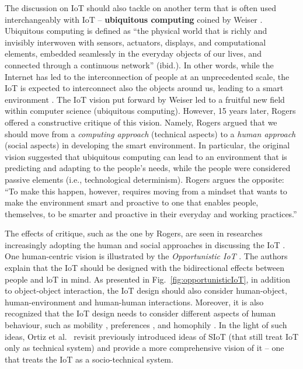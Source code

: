 The discussion on IoT should also tackle on another term that is often used interchangeably with IoT -- \textbf{ubiquitous computing} coined by Weiser \cite{weiser1991computer}. Ubiquitous computing is defined as ``the physical world that is richly and invisibly interwoven with sensors, actuators, displays, and computational elements, embedded seamlessly in the everyday objects of our lives, and connected through a continuous network'' (ibid.). In other words, while the Internet has led to the interconnection of people at an unprecedented scale, the IoT is expected to interconnect also the objects around us, leading to a smart environment \cite{gubbi2013internet}. %
The IoT vision put forward by Weiser \cite{weiser1991computer} led to a fruitful new field within computer science (ubiquitous computing). However, 15 years later, Rogers \cite{rogers2006moving} offered a constructive critique of this vision. Namely, Rogers argued that we should move from a \textit{computing approach} (technical aspects) to a \textit{human approach} (social aspects) in developing the smart environment. In particular, the original vision suggested that ubiquitous computing can lead to an environment that is predicting and adapting to the people's needs, while the people were considered passive elements (i.e., technological determinism). Rogers argues the opposite: ``To make this happen, however, requires moving from a mindset that wants to make the environment smart and proactive to one that enables people, themselves, to be smarter and proactive in their everyday and working practices.''

The effects of critique, such as the one by Rogers, are seen in researches increasingly adopting the human and social approaches in discussing the IoT \cite{ning2011future,guo2012opportunistic,tomasini2017effect}. One human-centric vision is illustrated by the \textit{Opportunistic IoT} \cite{guo2012opportunistic,guo2013opportunistic}. The authors explain that the IoT should be designed with the bidirectional effects between people and loT in mind. As presented in Fig.\ \ref{fig:opportunisticIoT}, in addition to object-object interaction, the IoT design should also consider human-object, human-environment and human-human interactions. Moreover, it is also recognized that the IoT design needs to consider different aspects of human behaviour, such as mobility \cite{tomasini2017effect}, preferences \cite{kowshalya2016community}, and homophily \cite{atzori2012social}. In the light of such ideas, Ortiz et al.\ \cite{ortiz2014cluster} revisit previously introduced ideas of {SIoT} (that still treat IoT only as technical system) and provide a more comprehensive vision of it -- one that treats the IoT as a socio-technical system.

